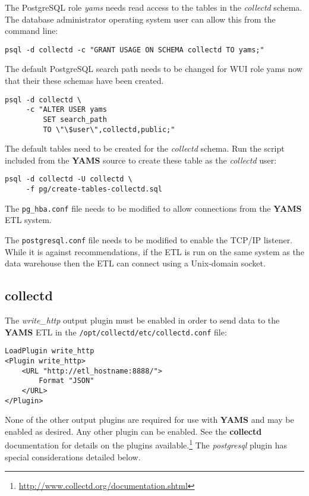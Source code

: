 \documentclass[a4paper,twoside,12pt]{article}
\begin{document}
The PostgreSQL role \textit{yams} needs read access to the tables in the
\textit{collectd} schema.  The database administrator operating system user can
allow this from the command line:
\begin{lstlisting}
psql -d collectd -c "GRANT USAGE ON SCHEMA collectd TO yams;"
\end{lstlisting}

The default PostgreSQL search path needs to be changed for WUI role yams now
that their these schemas have been created.
\lstset{language=sh}
\begin{lstlisting}
psql -d collectd \
     -c "ALTER USER yams
         SET search_path
         TO \"\$user\",collectd,public;"
\end{lstlisting}

The default tables need to be created for the \textit{collectd} schema.  Run
the script included from the \textbf{YAMS} source to create these table as the
\textit{collectd} user:
\lstset{language=sh}
\begin{lstlisting}
psql -d collectd -U collectd \
     -f pg/create-tables-collectd.sql
\end{lstlisting}

The \texttt{pg\_hba.conf} file needs to be modified to allow connections from
the \textbf{YAMS} ETL system.

The \texttt{postgresql.conf} file needs to be modified to enable the TCP/IP
listener.  While it is against recommendations, if the ETL is run on the same
system as the data warehouse then the ETL can connect using a Unix-domain
socket.

\subsection{collectd}

The \textit{write\_http} output plugin must be enabled in order to send data to
the \textbf{YAMS} ETL in the \texttt{/opt/collectd/etc/collectd.conf} file:
\lstset{language=xml}
\begin{lstlisting}
LoadPlugin write_http
<Plugin write_http>
    <URL "http://etl_hostname:8888/">
        Format "JSON"
    </URL>
</Plugin>
\end{lstlisting}

None of the other output plugins are required for use with \textbf{YAMS} and
may be enabled as desired.  Any other plugin can be enabled.  See the
\textbf{collectd} documentation for details on the plugins
available.\footnote{\url{http://www.collectd.org/documentation.shtml}}  The
\textit{postgresql} plugin has special considerations detailed below.
\end{document}
